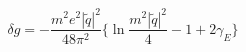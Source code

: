 \begin{equation}
 \delta g=-\frac{m^{2}e^{2}|\widetilde{q}|^{2} }{48\pi^{2}}
\biggl\{\ln\frac{m^{2}|\widetilde{q}|^{2}}{4}-1+2\gamma_{E}\biggr\}
\end{equation}

